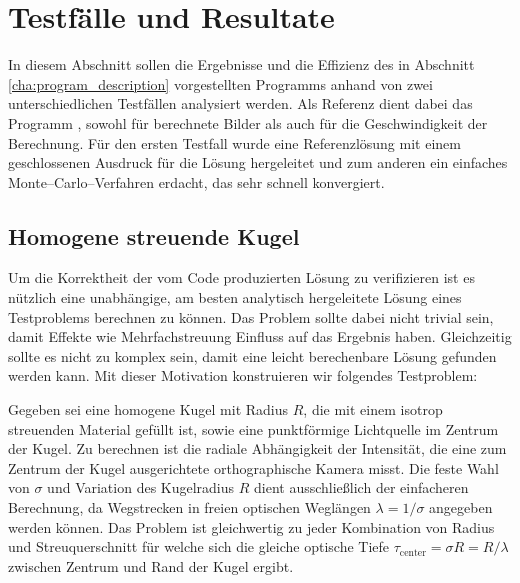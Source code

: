 	\chapter{Testfälle und Resultate}
	In diesem Abschnitt sollen die Ergebnisse und die Effizienz des in Abschnitt \ref{cha:program_description} vorgestellten Programms anhand von zwei unterschiedlichen Testfällen analysiert werden. Als Referenz dient dabei das Programm \mctd \citep{Wolf:2003p12974}, sowohl für berechnete Bilder als auch für die Geschwindigkeit der Berechnung. Für den ersten Testfall wurde eine Referenzlösung mit einem geschlossenen Ausdruck für die Lösung hergeleitet und zum anderen ein einfaches Monte--Carlo--Verfahren erdacht, das sehr schnell konvergiert.
	
	\section{Homogene streuende Kugel}
	Um die Korrektheit der vom Code produzierten Lösung zu verifizieren ist es nützlich eine unabhängige, am besten analytisch hergeleitete Lösung eines Testproblems berechnen zu können. Das Problem sollte dabei nicht trivial sein, damit Effekte wie Mehrfachstreuung Einfluss auf das Ergebnis haben. Gleichzeitig sollte es nicht zu komplex sein, damit eine leicht berechenbare Lösung gefunden werden kann.
	Mit dieser Motivation konstruieren wir folgendes Testproblem:
		
	Gegeben sei eine homogene Kugel mit Radius $R$, die mit einem isotrop streuenden Material gefüllt ist, sowie eine punktförmige Lichtquelle im Zentrum der Kugel. Zu berechnen ist die radiale Abhängigkeit der Intensität, die eine zum Zentrum der Kugel ausgerichtete orthographische Kamera misst. Die feste Wahl von $\sigma$ und Variation des Kugelradius $R$ dient ausschließlich der einfacheren Berechnung, da Wegstrecken in freien optischen  Weglängen $\lambda=1/\sigma$ angegeben werden können. Das Problem ist gleichwertig zu jeder Kombination von Radius und Streuquerschnitt für welche sich die gleiche optische Tiefe $\tau_\text{center}=\sigma R=R/\lambda$ zwischen Zentrum und Rand der Kugel ergibt.
	
